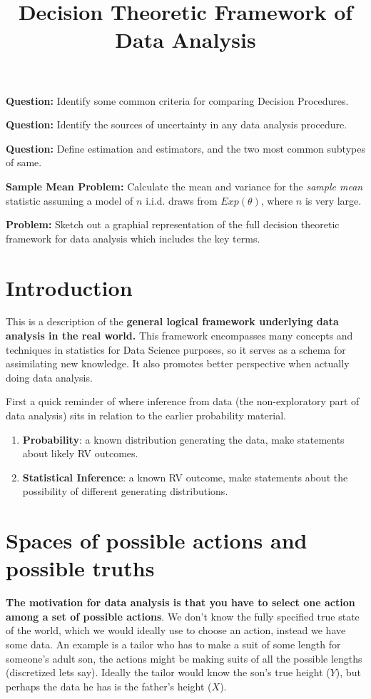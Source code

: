 




\title{Decision Theoretic Framework of Data Analysis}
\date{}
\maketitle


\textbf{Question:} Identify some common criteria for comparing Decision Procedures.
\nn

\textbf{Question:} Identify the sources of uncertainty in any data analysis procedure.
\nn

\textbf{Question:} Define estimation and estimators, and the two most common subtypes of same.
\nn

\textbf{Sample Mean Problem:} Calculate the mean and variance for the \emph{sample mean} statistic assuming a model of $n$ i.i.d. draws from $Exp(\theta)$, where $n$ is very large.
\nn

\textbf{Problem:} Sketch out a graphial representation of the full decision theoretic framework for data analysis which includes the key terms. 
\nn



\vspace{.3 in}
\tableofcontents

\section{Introduction}
This is a description of the \textbf{general logical framework underlying data analysis in the real world.} This framework encompasses many concepts and techniques in statistics for Data Science purposes, so it serves as a schema for assimilating new knowledge. It also promotes better perspective when actually doing data analysis.
\n

First a quick reminder of where inference from data (the non-exploratory part of data analysis) sits in relation to the earlier probability material.
\begin{enumerate}
\item \textbf{Probability}: a known distribution generating the data, make statements about likely RV outcomes.
\item \textbf{Statistical Inference}: a known RV outcome, make statements about the possibility of different generating distributions.
\end{enumerate}


\section{Spaces of possible actions and possible truths}
\textbf{The motivation for data analysis is that you have to select one action among a set of possible actions}. We don't know the fully specified true state of the world, which we would ideally use to choose an action, instead we have some data. An example is a tailor who has to make a suit of some length for someone's adult son, the actions might be making suits of all the possible lengths (discretized lets say). Ideally the tailor would know the son's true height ($Y$), but perhaps the data he has is the father's height ($X$). 
\n

